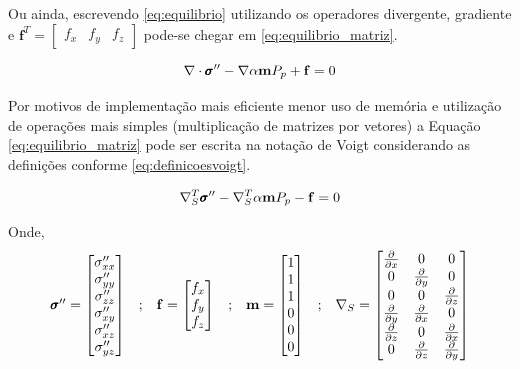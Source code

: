 Ou ainda, escrevendo \eqref{eq:equilibrio} utilizando os operadores divergente, gradiente e $\mathbf{f}^T=\begin{bmatrix}f_x & f_y & f_z\end{bmatrix}$ pode-se chegar em
\eqref{eq:equilibrio_matriz}.

\begin{equation}
\label{eq:equilibrio_matriz}
\nabla \cdot \stef - \nabla \alpha \mathbf{m} P_p + \mathbf{f} = 0
\end{equation}

Por motivos de implementação mais eficiente menor uso de memória e utilização de operações mais simples (multiplicação de matrizes por vetores) a Equação \eqref{eq:equilibrio_matriz} pode ser escrita na notação de Voigt considerando as definições conforme \eqref{eq:definicoesvoigt}.

\begin{equation}
\label{eq:equilibrio_final}
\sopnabla^T \stef - \sopnabla^T\alpha \mathbf{m}  P_p - \mathbf{f} = 0
\end{equation}

Onde,
\begin{equation}
\begin{matrix}\label{eq:definicoesvoigt}
\pmb{\sigma}^{\prime\prime} = \begin{bmatrix}
\sigma^{\prime\prime}_{xx}
\\
\sigma^{\prime\prime}_{yy}
\\
\sigma^{\prime\prime}_{zz}
\\
\sigma^{\prime\prime}_{xy}
\\
\sigma^{\prime\prime}_{xz}
\\
\sigma^{\prime\prime}_{yz}
\end{bmatrix}
&

;

&

\mathbf{f} = \begin{bmatrix}
f_{x}
\\
f_{y}
\\
f_{z}
\end{bmatrix}
&
;
&

\mathbf{m} = \begin{bmatrix} 1 \\ 1 \\ 1 \\ 0 \\ 0 \\ 0\end{bmatrix}

&
;

&
\nabla_S = \begin{bmatrix} \frac{\partial { }}{\partial x} & 0 & 0 \\ 0 & \frac{\partial { }}{\partial y} & 0 \\ 0 & 0 & \frac{\partial { }}{\partial z} \\ \frac{\partial { }}{\partial y} & \frac{\partial { }}{\partial x} & 0 \\ \frac{\partial { }}{\partial z} & 0 & \frac{\partial { }}{\partial x} \\ 0 & \frac{\partial { }}{\partial z} & \frac{\partial { }}{\partial y} \end{bmatrix}
\end{matrix}
\end{equation}



